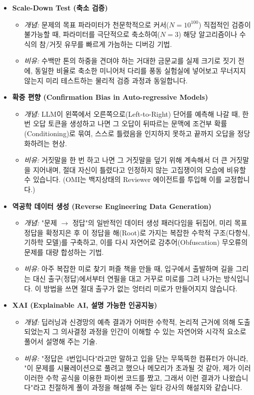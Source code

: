 \begin{itemize}
    \item \textbf{Scale-Down Test (축소 검증)}
    \begin{itemize}
        \item \textit{개념:} 문제의 목표 파라미터가 천문학적으로 커서($N=10^{100}$) 직접적인 검증이 불가능할 때, 파라미터를 극단적으로 축소하여($N=3$) 해당 알고리즘이나 수식의 참/거짓 유무를 빠르게 가늠하는 디버깅 기법.
        \item \textit{비유:} 수백만 톤의 하중을 견뎌야 하는 거대한 금문교를 실제 크기로 짓기 전에, 동일한 비율로 축소한 미니어처 다리를 풍동 실험실에 넣어보고 무너지지 않는지 미리 테스트하는 물리적 검증 과정과 동일합니다.
    \end{itemize}

    \item \textbf{확증 편향 (Confirmation Bias in Auto-regressive Models)}
    \begin{itemize}
        \item \textit{개념:} LLM이 왼쪽에서 오른쪽으로(Left-to-Right) 단어를 예측해 나갈 때, 한 번 오답 토큰을 생성하고 나면 그 오답이 뒤따르는 문맥에 조건부 확률(Conditioning)로 묶여, 스스로 틀렸음을 인지하지 못하고 끝까지 오답을 정당화하려는 현상.
        \item \textit{비유:} 거짓말을 한 번 하고 나면 그 거짓말을 덮기 위해 계속해서 더 큰 거짓말을 지어내며, 절대 자신이 틀렸다고 인정하지 않는 고집쟁이의 모습에 비유할 수 있습니다. (OMI는 백지상태의 Reviewer 에이전트를 투입해 이를 교정합니다.)
    \end{itemize}

    \item \textbf{역공학 데이터 생성 (Reverse Engineering Data Generation)}
    \begin{itemize}
        \item \textit{개념:} "문제 $\rightarrow$ 정답"의 일반적인 데이터 생성 패러다임을 뒤집어, 미리 목표 정답을 확정지은 후 이 정답을 해(Root)로 가지는 복잡한 수학적 구조(다항식, 기하학 모델)를 구축하고, 이를 다시 자연어로 감추어(Obfuscation) 무오류의 문제를 대량 합성하는 기법.
        \item \textit{비유:} 아주 복잡한 미로 찾기 퍼즐 책을 만들 때, 입구에서 출발하며 길을 그리는 대신 출구(정답)에서부터 연필을 대고 거꾸로 미로를 그려 나가는 방식입니다. 이 방법을 쓰면 절대 출구가 없는 엉터리 미로가 만들어지지 않습니다.
    \end{itemize}

    \item \textbf{XAI (Explainable AI, 설명 가능한 인공지능)}
    \begin{itemize}
        \item \textit{개념:} 딥러닝과 신경망의 예측 결과가 어떠한 수학적, 논리적 근거에 의해 도출되었는지 그 의사결정 과정을 인간이 이해할 수 있는 자연어와 시각적 요소로 풀어서 설명해 주는 기술.
        \item \textit{비유:} "정답은 4번입니다"라고만 말하고 입을 닫는 무뚝뚝한 컴퓨터가 아니라, "이 문제를 시뮬레이션으로 풀려고 했으나 메모리가 초과될 것 같아, 제가 이러이러한 수학 공식을 이용한 파이썬 코드를 짰고, 그래서 이런 결과가 나왔습니다"라고 친절하게 풀이 과정을 해설해 주는 일타 강사의 해설지와 같습니다.
    \end{itemize}
\end{itemize}
